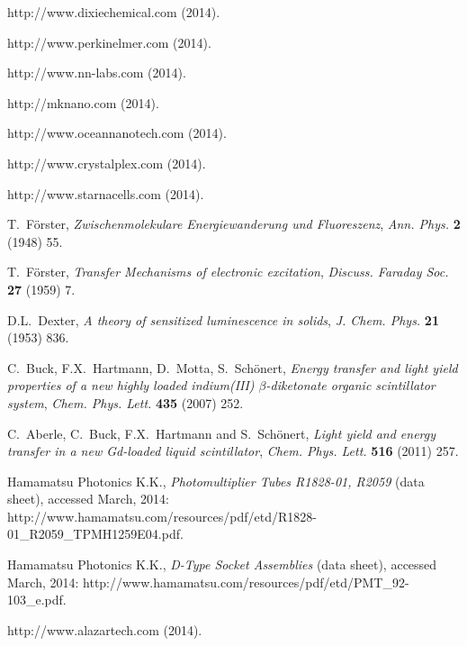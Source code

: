 \documentclass{JINST}
\begin{document}
\begin{thebibliography}{35}
http://www.dixiechemical.com (2014).

http://www.perkinelmer.com (2014).

http://www.nn-labs.com (2014).

http://mknano.com (2014).

 http://www.oceannanotech.com (2014).
 
 http://www.crystalplex.com (2014).

http://www.starnacells.com (2014).  

T.~F\"orster, \emph{Zwischenmolekulare Energiewanderung und Fluoreszenz}, \emph{Ann. Phys.} {\bf 2} (1948) 55.

T.~F\"orster, \emph{Transfer Mechanisms of electronic excitation}, \emph{Discuss. Faraday Soc.} {\bf 27} (1959) 7.

D.L.~Dexter, \emph{A theory of sensitized luminescence in solids}, \emph{J. Chem. Phys.} {\bf 21} (1953) 836.

C.~Buck, F.X.~Hartmann, D.~Motta, S.~Sch\"onert, \emph{Energy transfer and light yield properties of a new highly loaded indium(III) $\beta$-diketonate organic scintillator system}, \emph{Chem. Phys. Lett.} {\bf 435} (2007) 252. 

C.~Aberle, C.~Buck, F.X.~Hartmann and S.~Sch\"onert, \emph{Light yield and energy transfer in a new Gd-loaded liquid scintillator}, \emph{Chem. Phys. Lett.} {\bf 516} (2011) 257.  


Hamamatsu Photonics K.K., \emph{Photomultiplier Tubes R1828-01, R2059} (data sheet), accessed March, 2014: http://www.hamamatsu.com/resources/pdf/etd/R1828-01\_R2059\_TPMH1259E04.pdf.

Hamamatsu Photonics K.K., \emph{D-Type Socket Assemblies} (data sheet), accessed March, 2014: http://www.hamamatsu.com/resources/pdf/etd/PMT\_92-103\_e.pdf.

http://www.alazartech.com (2014).

\end{thebibliography}
\end{document}
